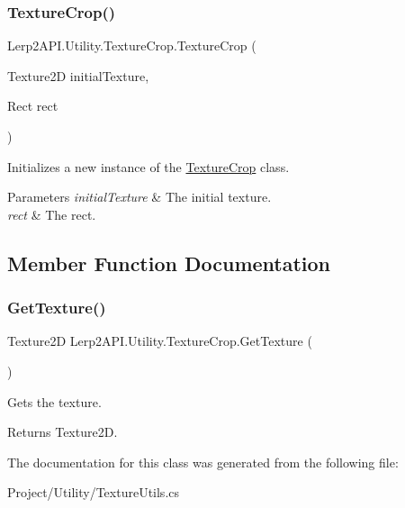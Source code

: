 \subsubsection{\texorpdfstring{Texture\+Crop()}{TextureCrop()}}
{\footnotesize\ttfamily Lerp2\+A\+P\+I.\+Utility.\+Texture\+Crop.\+Texture\+Crop (\begin{DoxyParamCaption}\item[{Texture2D}]{initial\+Texture,  }\item[{Rect}]{rect }\end{DoxyParamCaption})\hspace{0.3cm}{\ttfamily [inline]}}



Initializes a new instance of the \hyperlink{class_lerp2_a_p_i_1_1_utility_1_1_texture_crop}{Texture\+Crop} class. 


\begin{DoxyParams}{Parameters}
{\em initial\+Texture} & The initial texture.\\
\hline
{\em rect} & The rect.\\
\hline
\end{DoxyParams}


\subsection{Member Function Documentation}
\mbox{\label{class_lerp2_a_p_i_1_1_utility_1_1_texture_crop_a7e6088ab1e6dd67bf128038aa76252c2}} 
\subsubsection{\texorpdfstring{Get\+Texture()}{GetTexture()}}
{\footnotesize\ttfamily Texture2D Lerp2\+A\+P\+I.\+Utility.\+Texture\+Crop.\+Get\+Texture (\begin{DoxyParamCaption}{ }\end{DoxyParamCaption})\hspace{0.3cm}{\ttfamily [inline]}}



Gets the texture. 

\begin{DoxyReturn}{Returns}
Texture2D.
\end{DoxyReturn}


The documentation for this class was generated from the following file\+:\begin{DoxyCompactItemize}
\item 
Project/\+Utility/Texture\+Utils.\+cs\end{DoxyCompactItemize}
